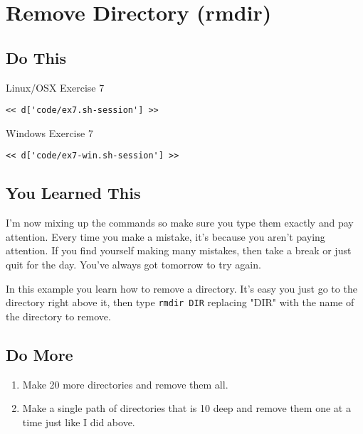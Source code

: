 \chapter{Remove Directory (rmdir)}

\section{Do This}

\begin{code}{Linux/OSX Exercise 7}
\begin{Verbatim}
<< d['code/ex7.sh-session'] >>
\end{Verbatim}
\end{code}

\begin{code}{Windows Exercise 7}
\begin{Verbatim}
<< d['code/ex7-win.sh-session'] >>
\end{Verbatim}
\end{code}

\section{You Learned This}

I'm now mixing up the commands so make sure you type them exactly and pay attention.
Every time you make a mistake, it's because you aren't paying attention.  If you
find yourself making many mistakes, then take a break or just quit for the day.
You've always got tomorrow to try again.

In this example you learn how to remove a directory.  It's easy you just
go to the directory right above it, then type \verb|rmdir DIR| replacing "DIR"
with the name of the directory to remove.

\section{Do More}

\begin{enumerate}
\item Make 20 more directories and remove them all.
\item Make a single path of directories that is 10 deep and remove them one at a
    time just like I did above.
\end{enumerate}

